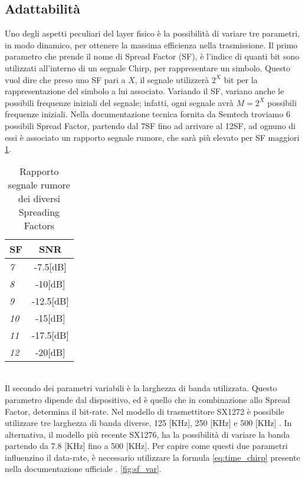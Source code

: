 \subsection{Adattabilità}
Uno degli aspetti peculiari del layer fisico è la possibilità di 
variare tre parametri, in modo dinamico, per ottenere la massima efficienza
nella trasmissione.
Il primo parametro che prende il nome di Spread Factor (SF),
è l'indice di quanti bit sono utilizzati all'interno di un segnale Chirp,
per rappresentare  un simbolo. Questo vuol dire che preso uno 
SF pari a $X$, il segnale  utilizzerà $2^X$ bit per la rappresentazione del simbolo a lui
associato. Variando il SF, variano anche le possibili frequenze iniziali del
segnale; infatti, ogni segnale avrà $M=2^X$ possibili frequenze iniziali.
Nella documentazione tecnica fornita da Semtech \cite{Basic_lora} troviamo 6 possibili Spread
Factor, partendo dal 7SF fino ad arrivare al 12SF, ad ognuno di essi è associato un
rapporto segnale rumore, che sarà più elevato per SF maggiori \ref{tab:SNR}. 
\begin{table}[ht]
        \centering
        \begin{tabular}{l|c}
                \textbf{SF}  & SNR \\
                \hline
                \emph{7}  & -7.5[dB] \\
                \emph{8}  & -10[dB]  \\
                \emph{9}   & -12.5[dB]  \\
                \emph{10} & -15[dB] \\
                \emph{11} & -17.5[dB] \\
                \emph{12} & -20[dB] \\
        \end{tabular}
        \caption{Rapporto segnale rumore dei diversi Spreading Factors}
        \label{tab:SNR}
\end{table}
\\
Il secondo dei parametri variabili è la larghezza di banda utilizzata. Questo
parametro dipende dal dispositivo, ed è quello che in  combinazione allo Spread Factor, 
determina il bit-rate.
Nel modello di trasmettitore SX1272 è possibile utilizzare tre larghezza
di banda diverse, 125 [KHz],
250 [KHz] e 500 [KHz] . In alternativa, il modello più recente SX1276, ha la possibilità di variare
la banda partendo da 7.8 [KHz] fino a 500 [KHz].
Per capire come questi due parametri influenzino il data-rate, 
è necessario utilizzare la formula \ref{eq:time_chirp} presente nella
documentazione ufficiale \cite{Basic_lora}.
\ref{fig:sf_var}.

